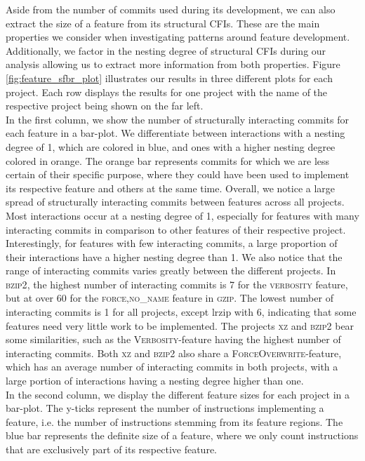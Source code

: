 Aside from the number of commits used during its development, we can also extract the size of a feature from its structural CFIs.
These are the main properties we consider when investigating patterns around feature development.
Additionally, we factor in the nesting degree of structural CFIs during our analysis allowing us to extract more information from both properties.
Figure \ref{fig:feature_sfbr_plot} illustrates our results in three different plots for each project.
Each row displays the results for one project with the name of the respective project being shown on the far left. \\
In the first column, we show the number of structurally interacting commits for each feature in a bar-plot.
We differentiate between interactions with a nesting degree of 1, which are colored in blue, and ones with a higher nesting degree colored in orange.
The orange bar represents commits for which we are less certain of their specific purpose, where they could have been used to implement its respective feature and others at the same time. 
Overall, we notice a large spread of structurally interacting commits between features across all projects.
Most interactions occur at a nesting degree of 1, especially for features with many interacting commits in comparison to other features of their respective project.
Interestingly, for features with few interacting commits, a large proportion of their interactions have a higher nesting degree than 1.
We also notice that the range of interacting commits varies greatly between the different projects.
In \textsc{bzip2}, the highest number of interacting commits is 7 for the \textsc{verbosity} feature, but at over 60 for the \textsc{force,no\_name} feature in \textsc{gzip}.
The lowest number of interacting commits is 1 for all projects, except lrzip with 6, indicating that some features need very little work to be implemented.
The projects \textsc{xz} and \textsc{bzip2} bear some similarities, such as the \textsc{Verbosity}-feature having the highest number of interacting commits.
Both \textsc{xz} and \textsc{bzip2} also share a \textsc{ForceOverwrite}-feature, which has an average number of interacting commits in both projects, with a large portion of interactions having a nesting degree higher than one. \\
In the second column, we display the different feature sizes for each project in a bar-plot.
The y-ticks represent the number of instructions implementing a feature, i.e. the number of instructions stemming from its feature regions.
The blue bar represents the definite size of a feature, where we only count instructions that are exclusively part of its respective feature.
